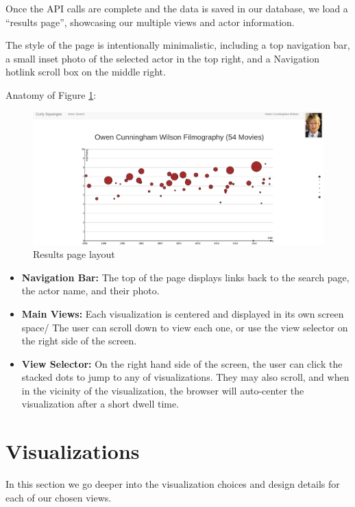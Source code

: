 \documentclass[12pt]{article}
\begin{document}
Once the API calls are complete and the data is saved in our database, we load a ``results page'',   showcasing our multiple views and actor information. 

The style of the page is intentionally minimalistic, including a top navigation bar, a small inset photo of the selected actor in the top right, and a Navigation hotlink scroll box on the middle right.

Anatomy of Figure \ref{fig:resultsPage}:


\begin{figure}\label{fig:resultsPage}
	\centering
	\includegraphics[width = \textwidth]{images/resultsPage.png}
	\caption{Results page layout}
\end{figure}


\begin{itemize}
	\item \textbf{Navigation Bar:}  The top of the page displays links back to the search page, the actor name, and their photo.
	\item \textbf{Main Views:} Each visualization is centered and displayed in its own screen space/ The user can scroll down to view each one, or use the view selector on the right side of the screen. 
	\item \textbf{View Selector:} On the right hand side of the screen, the user can click the stacked dots to jump to any of visualizations.  They may also scroll, and when in the vicinity of the visualization, the browser will auto-center the visualization after a short dwell time.
\end{itemize}

\newpage 

\section{Visualizations}

In this section we go deeper into the visualization choices and design details for each of our chosen views.
\end{document}
